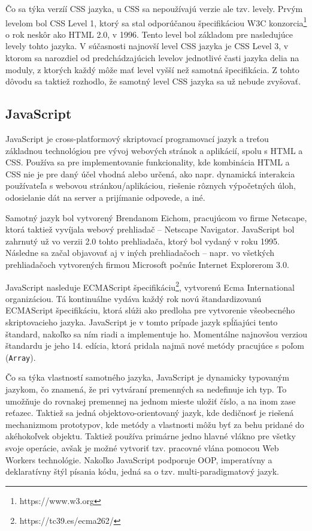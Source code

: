 Čo sa týka verzíí CSS jazyka, u CSS sa nepoužívajú verzie ale tzv. levely. Prvým levelom bol CSS Level 1, ktorý sa stal odporúčanou špecifikáciou W3C konzorcia\footnote{https://www.w3.org} o rok neskôr ako HTML 2.0, v 1996. Tento level bol základom pre nasledujúce levely tohto jazyka. V súčasnosti najnovší level CSS jazyka je CSS Level 3, v ktorom sa narozdiel od predchádzajúcich levelov jednotlivé časti jazyka delia na moduly, z ktorých každý môže mať level vyšší než samotná špecifikácia. Z tohto dôvodu sa taktiež rozhodlo, že samotný level CSS jazyka sa už nebude zvyšovať.

\subsection {JavaScript}
JavaScript je cross-platformový skriptovací programovací jazyk a treťou základnou technológiou pre vývoj webových stránok a aplikácií, spolu s HTML a CSS. Používa sa pre implementovanie funkcionality, kde kombinácia HTML a CSS nie je pre daný účel vhodná alebo určená, ako napr. dynamická interakcia používateľa s webovou stránkou/aplikáciou, riešenie rôznych výpočetných úloh, odosielanie dát na server a prijímanie odpovede, a iné.

Samotný jazyk bol vytvorený Brendanom Eichom, pracujúcom vo firme Netscape, ktorá taktiež vyvíjala webový prehliadač -- Netscape Navigator. JavaScript bol zahrnutý už vo verzii 2.0 tohto prehliadača, ktorý bol vydaný v roku 1995. Následne sa začal objavovať aj v iných prehliadačoch -- napr. vo všetkých prehliadačoch vytvorených firmou Microsoft počnúc Internet Explorerom 3.0. 

JavaScript nasleduje ECMAScript špecifikáciu\footnote{https://tc39.es/ecma262/}, vytvorenú Ecma International organizáciou. Tá kontinuálne vydáva každý rok novú štandardizovanú ECMAScript špecifikáciu, ktorá slúži ako predloha pre vytvorenie všeobecného skriptovacieho jazyka. JavaScript je v tomto prípade jazyk spĺňajúci tento štandard, nakoľko sa ním riadi a implementuje ho. Momentálne najnovšou verziou štandardu je jeho 14. edícia, ktorá pridala najmä nové metódy pracujúce s poľom (\texttt{Array}).

Čo sa týka vlastností samotného jazyka, JavaScript je dynamicky typovaným jazykom, čo znamená, že pri vytváraní premenných sa nedefinuje ich typ. To umožňuje do rovnakej premennej na jednom mieste uložiť číslo, a na inom zase reťazec. Taktiež sa jedná objektovo-orientovaný jazyk, kde dedičnosť je riešená mechanizmom prototypov, kde metódy a vlastnosti môžu byť za behu pridané do akéhokoľvek objektu. Taktiež používa primárne jedno hlavné vlákno pre všetky svoje operácie, avšak je možné vytvoriť tzv. pracovné vlána pomocou Web Workers technológie. Nakoľko JavaScript podporuje OOP, imperatívny a deklaratívny štýl písania kódu, jedná sa o tzv. multi-paradigmatový jazyk.

